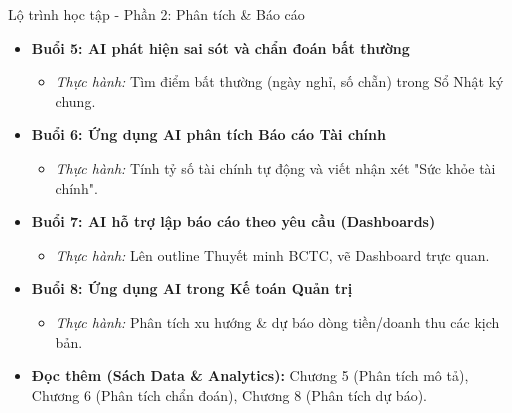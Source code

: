 \documentclass[aspectratio=169]{beamer}
\begin{document}
\begin{frame}{Lộ trình học tập - Phần 2: Phân tích \& Báo cáo}
    \begin{itemize}
        \item \textbf{Buổi 5: AI phát hiện sai sót và chẩn đoán bất thường}
        \begin{itemize}
            \item \textit{Thực hành:} Tìm điểm bất thường (ngày nghỉ, số chẵn) trong Sổ Nhật ký chung.
        \end{itemize}
        \item \textbf{Buổi 6: Ứng dụng AI phân tích Báo cáo Tài chính}
        \begin{itemize}
            \item \textit{Thực hành:} Tính tỷ số tài chính tự động và viết nhận xét "Sức khỏe tài chính".
        \end{itemize}
        \item \textbf{Buổi 7: AI hỗ trợ lập báo cáo theo yêu cầu (Dashboards)}
        \begin{itemize}
            \item \textit{Thực hành:} Lên outline Thuyết minh BCTC, vẽ Dashboard trực quan.
        \end{itemize}
        \item \textbf{Buổi 8: Ứng dụng AI trong Kế toán Quản trị}
        \begin{itemize}
            \item \textit{Thực hành:} Phân tích xu hướng \& dự báo dòng tiền/doanh thu các kịch bản.
        \end{itemize}
        \vspace{0.3cm}
        \item \textbf{Đọc thêm (Sách Data \& Analytics):} Chương 5 (Phân tích mô tả), Chương 6 (Phân tích chẩn đoán), Chương 8 (Phân tích dự báo).
    \end{itemize}
\end{frame}
\end{document}
